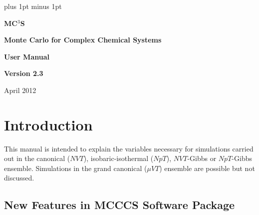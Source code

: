 \documentclass[12pt,letterpaper]{article}
\begin{document}
\parskip=6pt plus 1pt minus 1pt


\centerline{\bf \Huge MC$^3$S}

\vskip 24pt

\centerline{\bf \LARGE Monte Carlo for Complex Chemical Systems}

\vskip 24pt

\centerline{\bf \Large User Manual}

\vskip 24pt

\centerline{\bf \Large Version 2.3}

\vskip 36pt

\centerline{\large April 2012}

\eject

%
%
%
\section{Introduction}
This manual is intended to explain the variables necessary
for simulations carried out in the canonical ($NVT$),
isobaric-isothermal ($NpT$), $NVT$-Gibbs or $NpT$-Gibbs
ensemble. Simulations in the grand canonical ($\mu VT$)
ensemble are possible but not discussed.

\subsection{New Features in MCCCS Software Package}
\end{document}
